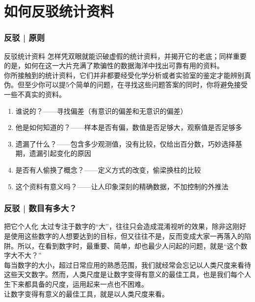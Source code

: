 \section{如何反驳统计资料}
\begin{frame}
  \frametitle{反驳 | 原则}
  \begin{block}{\alert{反驳统计资料}}
    怎样凭双眼就能识破虚假的统计资料，并揭开它的老底；同样重要的是，如何在这一大片充满了欺骗性的数据海洋中找出可靠有用的资料。\\
    \vspace{0.5em}
    你所接触到的统计资料，它们并非都要经受化学分析或者实验室的鉴定才能辨别真伪。但至少你可以提5个简单的问题，在寻找这些问题答案的同时，你将避免接受一些不真实的资料。
    \begin{enumerate}
      \item 谁说的？——寻找偏差（有意识的偏差和无意识的偏差）
      \item 他是如何知道的？——样本是否有偏，数值是否足够大，观察值是否足够多
      \item 遗漏了什么？——包含多少观测值，没有比较，仅给出百分数，巧妙选择基期，遗漏引起变化的原因
      \item 是否有人偷换了概念？——定义方式的改变，偷梁换柱的比较
      \item 这个资料有意义吗？——让人印象深刻的精确数据，不加控制的外推法
    \end{enumerate}
  \end{block}
\end{frame}

\begin{frame}
  \frametitle{反驳 | 数目有多大？}
  \begin{block}{把它个人化}
  太过专注于数字的“大”，往往只会造成混淆视听的效果，除非这刚好是使用这些数字的人想要达到的目标，但又往往不是，反而变成大家一再落入的陷阱。所以，在看到数字时，最重要、简单，却也最少人问起的问题，就是“这个数字大不大？”\\
  \vspace{0.5em}
  每当数字的大小，超过日常应用的熟悉范围，我们就经常会忘记以人类尺度来看待这些天文数字。然而，\alert{人类尺度是让数字变得有意义的最佳工具}，也是我们每个人生下来都具备的尺度，运用起来一点也不困难。\\
  \vspace{0.5em}
  \alert{让数字变得有意义的最佳工具，就是以人类尺度来看。}
  \end{block}
\end{frame}

